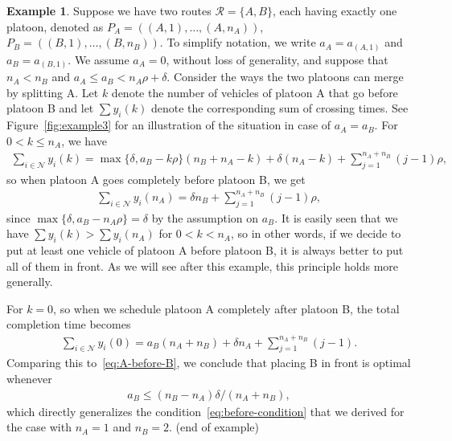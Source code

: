 \documentclass[a4paper]{report}
\theoremstyle{definition}
\newtheorem{eg}{Example}[chapter]
\theoremstyle{plain}
\begin{document}
\begin{eg}
  \label{example3}
  Suppose we have two routes $\mathcal{R} = \{ A, B \}$, each having exactly one
  platoon, denoted as $P_{A} = ((A,1), \dots, (A,n_{A}))$,
  $P_{B} = ((B,1), \dots, (B,n_{B}))$. To simplify notation, we write
  $a_{A} = a_{(A,1)}$ and $a_{B} = a_{(B,1)}$. We assume $a_{A} = 0$, without
  loss of generality, and suppose that $n_{A} < n_{B}$ and
  $a_{A} \leq a_{B} < n_{A}\rho + \delta$. Consider the ways the two platoons
  can merge by splitting A. Let $k$ denote the number of vehicles of platoon A
  that go before platoon B and let $\sum y_{i}(k)$ denote the corresponding
  sum of crossing times. See Figure~\ref{fig:example3} for an illustration of the
  situation in case of $a_{A} = a_{B}$. For $0 < k \leq n_{A}$, we have
  \begin{align*}
    \sum_{i \in \mathcal{N}} y_{i} (k) = \max\{ \delta, a_{B} - k\rho\} (n_{B} + n_{A} - k) + \delta (n_{A} - k) + \sum_{j=1}^{n_{A}+n_{B}} (j-1) \rho ,
  \end{align*}
  so when platoon A goes completely before platoon B, we get
  \begin{align}
    \sum_{i \in \mathcal{N}} y_{i} (n_{A}) = \delta n_{B} + \sum_{j=1}^{n_{A}+n_{B}} (j-1) \rho ,
    \label{eq:A-before-B}
  \end{align}
  since $\max\{ \delta, a_{B} - n_{A} \rho \} = \delta$ by the assumption on $a_{B}$. It is
  easily seen that we have $\sum y_{i}(k) > \sum y_{i} (n_{A})$ for $0 < k < n_{A}$,
  so in other words, if we decide to put at least one vehicle of platoon A
  before platoon B, it is always better to put all of them in front. As we will
  see after this example, this principle holds more generally.

  For $k=0$, so when we schedule platoon A completely after platoon B, the total
  completion time becomes
  \begin{align*}
    \sum_{i \in \mathcal{N}} y_{i} (0) = a_{B} (n_{A} + n_{B}) + \delta n_{A} + \sum_{j=1}^{n_{A}+n_{B}} (j-1) .
  \end{align*}
  Comparing this to~\eqref{eq:A-before-B}, we conclude that placing B in front
  is optimal whenever
  \begin{align*}
    a_{B} \leq (n_{B} - n_{A}) \delta / (n_{A} + n_{B}) ,
  \end{align*}
  which directly generalizes the condition~\eqref{eq:before-condition} that we
  derived for the case with $n_{A} = 1$ and $n_{B} = 2$. (end of example)
\end{eg}
\end{document}
